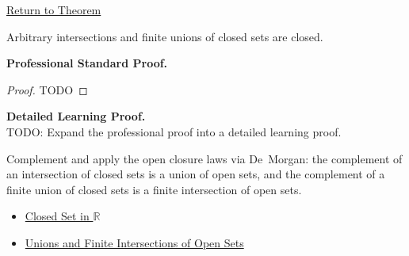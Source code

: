 \newpage
{}
\label{prf:closed-set-closure-operations}

\begin{remark*}[Return]
\hyperref[thm:closed-set-closure-operations]{Return to Theorem}
\end{remark*}

\begin{theorem*}
Arbitrary intersections and finite unions of closed sets are closed.
\end{theorem*}

\textbf{Professional Standard Proof.}~\\
\begin{proof}
TODO
\end{proof}

\textbf{Detailed Learning Proof.}~\\
TODO: Expand the professional proof into a detailed learning proof.

\begin{remark*}
Complement and apply the open closure laws via De~Morgan: the complement of an intersection of closed sets is a union of open sets, and the complement of a finite union of closed sets is a finite intersection of open sets.
\end{remark*}

\begin{dependencies}
\begin{itemize}
  \item \hyperref[def:closed-set]{Closed Set in $\mathbb{R}$}
  \item \hyperref[thm:open-set-closure-operations]{Unions and Finite Intersections of Open Sets}
\end{itemize}
\end{dependencies}
